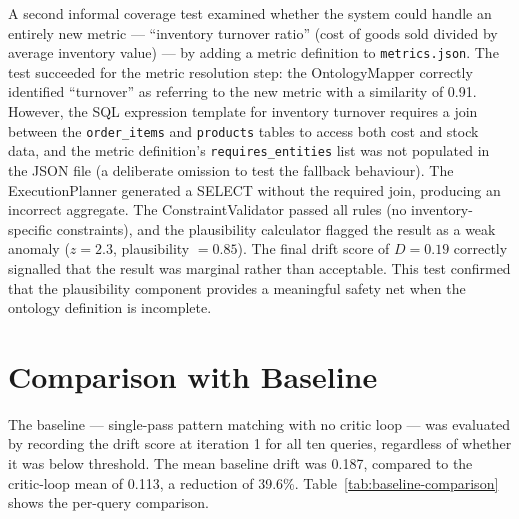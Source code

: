 \documentclass[12pt,a4paper]{report}
\begin{document}
A second informal coverage test examined whether the system could handle an entirely new metric — ``inventory turnover ratio'' (cost of goods sold divided by average inventory value) — by adding a metric definition to \texttt{metrics.json}. The test succeeded for the metric resolution step: the OntologyMapper correctly identified ``turnover'' as referring to the new metric with a similarity of 0.91. However, the SQL expression template for inventory turnover requires a join between the \texttt{order\_items} and \texttt{products} tables to access both cost and stock data, and the metric definition's \texttt{requires\_entities} list was not populated in the JSON file (a deliberate omission to test the fallback behaviour). The ExecutionPlanner generated a SELECT without the required join, producing an incorrect aggregate. The ConstraintValidator passed all rules (no inventory-specific constraints), and the plausibility calculator flagged the result as a weak anomaly ($z = 2.3$, plausibility $= 0.85$). The final drift score of $D = 0.19$ correctly signalled that the result was marginal rather than acceptable. This test confirmed that the plausibility component provides a meaningful safety net when the ontology definition is incomplete.

\section{Comparison with Baseline}
\label{sec:baseline-comparison}

The baseline — single-pass pattern matching with no critic loop — was evaluated by recording the drift score at iteration 1 for all ten queries, regardless of whether it was below threshold. The mean baseline drift was 0.187, compared to the critic-loop mean of 0.113, a reduction of 39.6\%. Table~\ref{tab:baseline-comparison} shows the per-query comparison.
\end{document}
